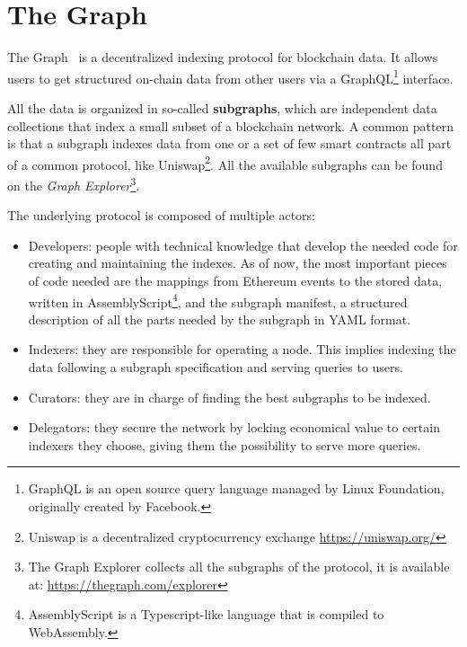 \section{The Graph}

The Graph~\cite{the-graph} is a decentralized indexing protocol for blockchain data. It allows users to get structured on-chain data from other users via a GraphQL\footnote{GraphQL is an open source query language managed by Linux Foundation, originally created by Facebook.} interface. 

All the data is organized in so-called \textbf{subgraphs}, which are independent data collections that index a small subset of a blockchain network. A common pattern is that a subgraph indexes data from one or a set of few smart contracts all part of a common protocol, like Uniswap\footnote{Uniswap is a decentralized cryptocurrency exchange \url{https://uniswap.org/}}. All the available subgraphs can be found on the \textit{Graph Explorer}\footnote{The Graph Explorer collects all the subgraphs of the protocol, it is available at: \url{https://thegraph.com/explorer}}.

The underlying protocol is composed of multiple actors:

\begin{itemize}
  \item Developers: people with technical knowledge that develop the needed code for creating and maintaining the indexes. As of now, the most important pieces of code needed are the mappings from Ethereum events to the stored data, written in AssemblyScript\footnote{AssemblyScript is a Typescript-like language that is compiled to WebAssembly.}, and the subgraph manifest, a structured description of all the parts needed by the subgraph in YAML format.  
  \item Indexers: they are responsible for operating a node. This implies indexing the data following a subgraph specification and serving queries to users.
  \item Curators: they are in charge of finding the best subgraphs to be indexed.
  \item Delegators: they secure the network by locking economical value to certain indexers they choose, giving them the possibility to serve more queries.
\end{itemize}

